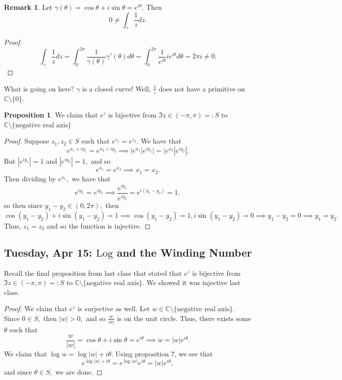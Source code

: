 \documentclass[10pt, oneside]{article}
\newcommand{\bbC}{\mathbb{C}}
\newcommand{\Log}{\text{Log}}
\newcommand{\sm}{\setminus}
\theoremstyle{definition}
\newtheorem{prop}{Proposition}
\newtheorem{rem}{Remark}
\begin{document}
\begin{rem}
    Let $\gamma(\theta) = \cos \theta + i\sin \theta = e^{i\theta}.$ Then 
    \[0 \neq \int_\gamma \frac{1}{z}dz.\]
\begin{proof}
    \[\int_\gamma \frac{1}{z}dz = \int_0^{2\pi}\frac{1}{\gamma(\theta)}\gamma'(\theta)d\theta = \int_0^{2\pi}\frac{1}{e^{i\theta}}ie^{i\theta}d\theta = 2\pi i \neq 0.\]
\end{proof}
What is going on here? $\gamma$ is a closed curve! Well, $\frac{1}{z}$ does not have a primitive on $\bbC \sm \{0\}.$
\end{rem}
\begin{prop}
    We claim that $e^z$ is bijective from $\Im{z} \in (-\pi, \pi) =: S$ to $\bbC\sm\{\text{negative real axis}\}$
\end{prop}
\begin{proof}
    Suppose $z_1, z_2 \in S$ such that $e^{z_1} = e^{z_2}.$ We have that 
    \[e^{x_1 + iy_1} = e^{x_2 + iy_2} \implies |e^{x_1}|e^{iy_1}| = |e^{x_2}|e^{iy_2}|.\] But $|e^{iy_1}| = 1$ and $|e^{iy_2}| = 1,$ and so 
    \[e^{x_1} = e^{x_2} \implies x_1 = x_2.\] Then dividing by $e^{x_1},$ we have that 
    \[e^{iy_1} = e^{i y_2} \implies \frac{e^{i y_1}}{e^{i y_2}} =e^{i(y_1 - y_2)} = 1,\] so then since $y_1 - y_2 \in (0, 2\pi),$ then
    \[\cos(y_1 - y_2) + i \sin (y_1 - y_2) = 1 \implies \cos(y_1 - y_2) = 1, i\sin(y_1 - y_2) = 0 \implies y_1 - y_2 = 0 \implies y_1 = y_2.\] Thus, $z_1 = z_2$ and so the function is injective.  
\end{proof}


\newpage
\subsection{Tuesday, Apr 15: $\Log$ and the Winding Number}
Recall the final proposition from last class that stated that $e^z$ is bijective from $\Im{z} \in (-\pi, \pi) =: S$ to $\bbC\sm\{\text{negative real axis}\}.$ We showed it was injective last class. 
\begin{proof}
    We claim that $e^z$ is surjective as well. Let $w \in \bbC\sm\{\text{negative real axis}\}.$ Since $0 \in S,$ then $|w| >0,$ and so $\frac{w}{|w|}$ is on the unit circle. Thus, there exists some $\theta$ such that 
    \[\frac{w}{|w|} = \cos \theta + i \sin \theta = e^{i\theta} \implies w = |w|e^{i\theta}.\] We claim that $\log w = \log |w| + i\theta.$ Using proposition 7, we see that 
    \[e^{\log |w| + i\theta} = e^{\log |w|}e^{i\theta} = |w|e^{i\theta},\] and since $\theta \in S,$ we are done.
\end{proof}
\end{document}
